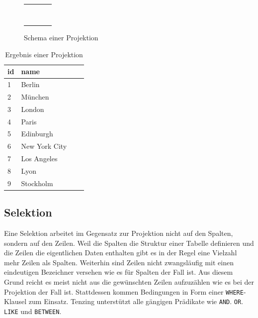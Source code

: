 \documentclass[a4paper]{article}
\begin{document}
\begin{figure}[H]
\centering
  \begin{tabular}{| c | c | c | c |}
    \hline
     \cellcolor{cell} & \cellcolor{cell} & & \\ \hline
     \cellcolor{cell} & \cellcolor{cell} & & \\ \hline
     \cellcolor{cell} & \cellcolor{cell} & & \\ \hline
     \cellcolor{cell} & \cellcolor{cell} & & \\ \hline
     \cellcolor{cell} & \cellcolor{cell} & & \\ \hline
     \cellcolor{cell} & \cellcolor{cell} & & \\ \hline
     \cellcolor{cell} & \cellcolor{cell} & & \\ \hline
     \cellcolor{cell} & \cellcolor{cell} & & \\ \hline
     \cellcolor{cell} & \cellcolor{cell} & & \\ \hline
  \end{tabular}
\caption{Schema einer Projektion}
\label{fig:projection}
\end{figure}

\begin{table}[H]
\centering
  \begin{tabular}{| l | l | l | l |}
    \hline
    id & name \\ \hline
    \hline
   1 & Berlin \\ \hline
   2 & München \\ \hline
   3 & London \\ \hline
   4 & Paris \\ \hline
   5 & Edinburgh \\ \hline
   6 & New York City \\ \hline
   7 & Los Angeles \\ \hline
   8 & Lyon \\ \hline
   9 & Stockholm \\ \hline
  \end{tabular}
\caption{Ergebnis einer Projektion}
\label{tab:projection}
\end{table}

\newpage
\subsection{Selektion}
Eine Selektion arbeitet im Gegensatz zur Projektion nicht auf den Spalten, sondern auf den Zeilen. Weil die Spalten die Struktur einer Tabelle definieren und die Zeilen die eigentlichen Daten enthalten gibt es in der Regel eine Vielzahl mehr Zeilen als Spalten. Weiterhin sind Zeilen nicht zwangsläufig mit einen eindeutigen Bezeichner versehen wie es für Spalten der Fall ist. Aus diesem Grund reicht es meist nicht aus die gewünschten Zeilen aufzuzählen wie es bei der Projektion der Fall ist. Stattdessen kommen Bedingungen in Form einer \texttt{WHERE}-Klausel zum Einsatz. Tenzing unterstützt alle gängigen Prädikate wie \texttt{AND}. \texttt{OR}. \texttt{LIKE} und \texttt{BETWEEN}.
\end{document}
